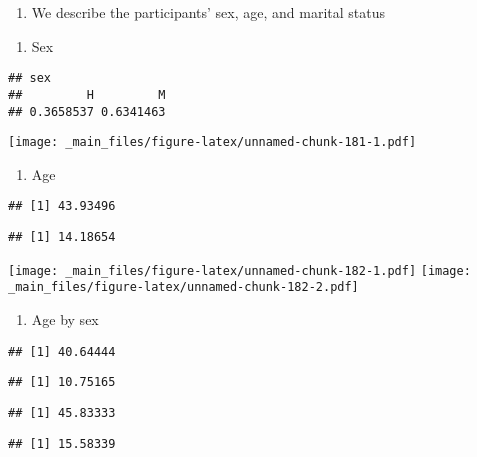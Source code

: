 \documentclass[
]{book}
\providecommand{\tightlist}{%
  \setlength{\itemsep}{0pt}\setlength{\parskip}{0pt}}
\begin{document}
\begin{enumerate}
\def\labelenumi{\arabic{enumi}.}
\tightlist
\item
  We describe the participants' sex, age, and marital status
\end{enumerate}

\begin{enumerate}
\def\labelenumi{\alph{enumi}.}
\tightlist
\item
  Sex
\end{enumerate}

\begin{verbatim}
## sex
##         H         M 
## 0.3658537 0.6341463
\end{verbatim}

\texttt{[image: \_main\_files/figure-latex/unnamed-chunk-181-1.pdf]}

\begin{enumerate}
\def\labelenumi{\alph{enumi}.}
\setcounter{enumi}{1}
\tightlist
\item
  Age
\end{enumerate}

\begin{verbatim}
## [1] 43.93496
\end{verbatim}

\begin{verbatim}
## [1] 14.18654
\end{verbatim}

\texttt{[image: \_main\_files/figure-latex/unnamed-chunk-182-1.pdf]} \texttt{[image: \_main\_files/figure-latex/unnamed-chunk-182-2.pdf]}

\begin{enumerate}
\def\labelenumi{\alph{enumi}.}
\setcounter{enumi}{2}
\tightlist
\item
  Age by sex
\end{enumerate}

\begin{verbatim}
## [1] 40.64444
\end{verbatim}

\begin{verbatim}
## [1] 10.75165
\end{verbatim}

\begin{verbatim}
## [1] 45.83333
\end{verbatim}

\begin{verbatim}
## [1] 15.58339
\end{verbatim}
\end{document}
